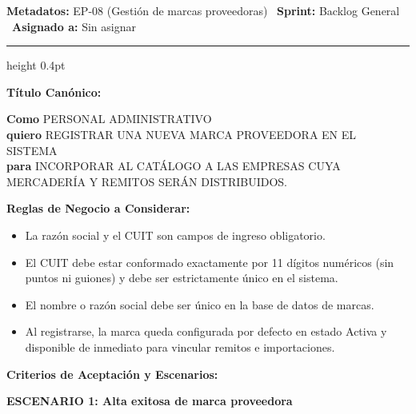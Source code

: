 \documentclass[a4paper,9pt]{article}
\begin{document}
\begin{tcolorbox}[hucard, title={\textbf{HU-252: AGREGAR MARCA PROVEEDORA} \hfill \scriptsize \colorbox{bluestatus}{\textbf{\ New\ }} \quad \colorbox{white}{\textcolor{primarydark}{\textbf{\ 0 pts\ }}}}]
\vspace{-1pt}
\noindent\textbf{\footnotesize Metadatos:} EP-08 (Gestión de marcas proveedoras) \textbar\ \textbf{Sprint:} Backlog General \textbar\ \textbf{Asignado a:} Sin asignar\par\vspace{2pt}
\hrule height 0.4pt\par\vspace{3pt}
\noindent\textbf{\footnotesize Título Canónico:}\par\vspace{1pt}
{\small \textbf{Como} PERSONAL ADMINISTRATIVO \\ \textbf{quiero} REGISTRAR UNA NUEVA MARCA PROVEEDORA EN EL SISTEMA \\ \textbf{para} INCORPORAR AL CATÁLOGO A LAS EMPRESAS CUYA MERCADERÍA Y REMITOS SERÁN DISTRIBUIDOS.}\par\vspace{3pt}
\noindent\textbf{\footnotesize Reglas de Negocio a Considerar:}\par\vspace{1pt}
{\footnotesize
\begin{itemize}[leftmargin=12pt, nosep, itemsep=1.5pt, topsep=1pt]
\item La razón social y el CUIT son campos de ingreso obligatorio.
\item El CUIT debe estar conformado exactamente por 11 dígitos numéricos (sin puntos ni guiones) y debe ser estrictamente único en el sistema.
\item El nombre o razón social debe ser único en la base de datos de marcas.
\item Al registrarse, la marca queda configurada por defecto en estado Activa y disponible de inmediato para vincular remitos e importaciones.
\end{itemize}
}\par\vspace{3pt}
\noindent\textbf{\footnotesize Criterios de Aceptación y Escenarios:}\par\vspace{2pt}
{\footnotesize
\noindent\textbf{\textcolor{secondarydark}{ESCENARIO 1:  Alta exitosa de marca proveedora}}\par\vspace{1pt}
}
\end{tcolorbox}
\end{document}
